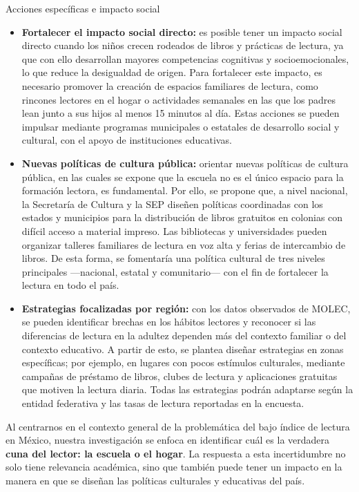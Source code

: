 \documentclass[aps,reprint]{revtex4-2}
\begin{document}
\vspace{1\baselineskip}
Acciones específicas e impacto social
\begin{itemize}
    \item \textbf{Fortalecer el impacto social directo:} es posible tener un impacto social directo cuando los niños crecen rodeados de libros y prácticas de lectura, ya que con ello desarrollan mayores competencias cognitivas y socioemocionales, lo que reduce la desigualdad de origen. Para fortalecer este impacto, es necesario promover la creación de espacios familiares de lectura, como rincones lectores en el hogar o actividades semanales en las que los padres lean junto a sus hijos al menos 15 minutos al día. Estas acciones se pueden impulsar mediante programas municipales o estatales de desarrollo social y cultural, con el apoyo de instituciones educativas.  

    \item \textbf{Nuevas políticas de cultura pública:} orientar nuevas políticas de cultura pública, en las cuales se expone que la escuela no es el único espacio para la formación lectora, es fundamental. Por ello, se propone que, a nivel nacional, la Secretaría de Cultura y la SEP diseñen políticas coordinadas con los estados y municipios para la distribución de libros gratuitos en colonias con difícil acceso a material impreso. Las bibliotecas y universidades pueden organizar talleres familiares de lectura en voz alta y ferias de intercambio de libros. De esta forma, se fomentaría una política cultural de tres niveles principales —nacional, estatal y comunitario— con el fin de fortalecer la lectura en todo el país.  

    \item \textbf{Estrategias focalizadas por región:} con los datos observados de MOLEC, se pueden identificar brechas en los hábitos lectores y reconocer si las diferencias de lectura en la adultez dependen más del contexto familiar o del contexto educativo. A partir de esto, se plantea diseñar estrategias en zonas específicas; por ejemplo, en lugares con pocos estímulos culturales, mediante campañas de préstamo de libros, clubes de lectura y aplicaciones gratuitas que motiven la lectura diaria. Todas las estrategias podrán adaptarse según la entidad federativa y las tasas de lectura reportadas en la encuesta.  
\end{itemize}  

Al centrarnos en el contexto general de la problemática del bajo índice de lectura en México, nuestra investigación se enfoca en identificar cuál es la verdadera \textbf{cuna del lector: la escuela o el hogar}. La respuesta a esta incertidumbre no solo tiene relevancia académica, sino que también puede tener un impacto en la manera en que se diseñan las políticas culturales y educativas del país.
\end{document}

